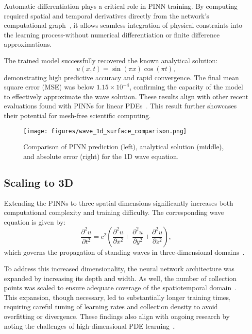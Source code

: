 \documentclass[12pt,a4paper]{article}
\begin{document}
Automatic differentiation plays a critical role in PINN training. By computing required spatial and temporal derivatives directly from the network’s computational graph~\cite{baydin2018automatic}, it allows seamless integration of physical constraints into the learning process-without numerical differentiation or finite difference approximations.

The trained model successfully recovered the known analytical solution:
\begin{equation}
u(x,t) = \sin(\pi x)\cos(\pi t),
\label{eq:wave-1d-analytic}
\end{equation}
demonstrating high predictive accuracy and rapid convergence. The final mean square error (MSE) was below \( 1.15 \times 10^{-4} \), confirming the capacity of the model to effectively approximate the wave solution. These results align with other recent evaluations found with PINNs for linear PDEs~\cite{cuomo2022scientific}. This result further showcases their potential for mesh-free scientific computing.

\begin{figure}[h!]
  \centering
  \texttt{[image: figures/wave\_1d\_surface\_comparison.png]}
  \caption{Comparison of PINN prediction (left), analytical solution (middle), and absolute error (right) for the 1D wave equation.}
  \label{fig:1d-wave}
\end{figure}

\subsection{Scaling to 3D}

Extending the PINNs to three spatial dimensions significantly increases both computational complexity and training difficulty. The corresponding wave equation is given by:
\begin{equation}
\frac{\partial^2 u}{\partial t^2} = c^2\left(\frac{\partial^2 u}{\partial x^2} + \frac{\partial^2 u}{\partial y^2} + \frac{\partial^2 u}{\partial z^2}\right),
\label{eq:wave-3d}
\end{equation}
which governs the propagation of standing waves in three-dimensional domains~\cite{strauss2007partial, taylor2010partial}.

To address this increased dimensionality, the neural network architecture was expanded by increasing its depth and width. As well, the number of collection points was scaled to ensure adequate coverage of the spatiotemporal domain~\cite{raissi2019physics}. This expansion, though necessary, led to substantially longer training times, requiring careful tuning of learning rates and collection density to avoid overfitting or divergence. These findings also align with ongoing research by noting the challenges of high-dimensional PDE learning~\cite{wang2022understanding}.
\end{document}
